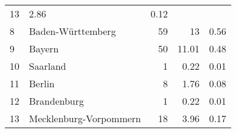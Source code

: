 \begin{longtable}{lXrrr}
       \num{13} &
       \num[round-mode=places,round-precision=2]{2,86} &
         \num[round-mode=places,round-precision=2]{0,12} \\

     8 &
     \multicolumn{1}{X}{ Baden-Württemberg   } &


       \num{59} &
       \num[round-mode=places,round-precision=2]{13} &
         \num[round-mode=places,round-precision=2]{0,56} \\

     9 &
     \multicolumn{1}{X}{ Bayern   } &


       \num{50} &
       \num[round-mode=places,round-precision=2]{11,01} &
         \num[round-mode=places,round-precision=2]{0,48} \\

     10 &
     \multicolumn{1}{X}{ Saarland   } &


       \num{1} &
       \num[round-mode=places,round-precision=2]{0,22} &
         \num[round-mode=places,round-precision=2]{0,01} \\

     11 &
     \multicolumn{1}{X}{ Berlin   } &


       \num{8} &
       \num[round-mode=places,round-precision=2]{1,76} &
         \num[round-mode=places,round-precision=2]{0,08} \\

     12 &
     \multicolumn{1}{X}{ Brandenburg   } &


       \num{1} &
       \num[round-mode=places,round-precision=2]{0,22} &
         \num[round-mode=places,round-precision=2]{0,01} \\

     13 &
     \multicolumn{1}{X}{ Mecklenburg-Vorpommern   } &


       \num{18} &
       \num[round-mode=places,round-precision=2]{3,96} &
         \num[round-mode=places,round-precision=2]{0,17} \\


\end{longtable}
